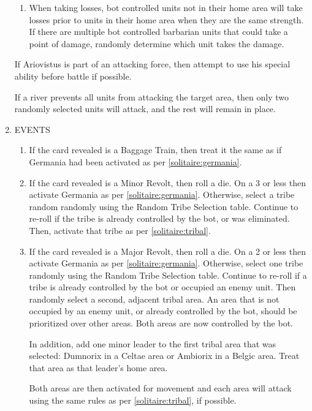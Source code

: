 \begin{enumerate}
\begin{enumerate}[leftmargin=0in]
    \item When taking losses, bot controlled units not in their home area will take losses prior to units in their home area when they are the same strength. If there are multiple bot controlled barbarian units that could take a point of damage, randomly determine which unit takes the damage.
  \end{enumerate}
  
  If Ariovistus is part of an attacking force, then attempt to use his special ability before battle if possible.

  If a river prevents all units from attacking the target area, then only two randomly selected units will attack, and the rest will remain in place.

  \item EVENTS
  \begin{enumerate}[leftmargin=0in]
    \item If the card revealed is a Baggage Train, then treat it the same as if Germania had been activated as per \ref{solitaire:germania}.
    
    \item If the card revealed is a Minor Revolt, then roll a die. On a 3 or less then activate Germania as per \ref{solitaire:germania}. Otherwise, select a tribe random randomly using the Random Tribe Selection table. Continue to re-roll if the tribe is already controlled by the bot, or was eliminated. Then, activate that tribe as per \ref{solitaire:tribal}.
  
    \item If the card revealed is a Major Revolt, then roll a die. On a 2 or less then activate Germania as per \ref{solitaire:germania}. Otherwise, select one tribe randomly using the Random Tribe Selection table. Continue to re-roll if a tribe is already controlled by the bot or occupied an enemy unit. Then randomly select a second, adjacent tribal area. An area that is not occupied by an enemy unit, or already controlled by the bot, should be prioritized over other areas. Both areas are now controlled by the bot.
  
    In addition, add one minor leader to the first tribal area that was selected: Dumnorix in a Celtae area or Ambiorix in a Belgic area. Treat that area as that leader's home area.
  
    Both areas are then activated for movement and each area will attack using the same rules as per \ref{solitaire:tribal}, if possible.
  

\end{enumerate}
\end{enumerate}
